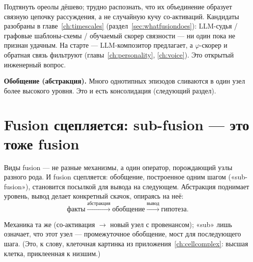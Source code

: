 \begin{openq}
Подтянуть ореолы дёшево; трудно распознать, что их объединение образует
связную цепочку рассуждения, а не случайную кучу со-активаций. Кандидаты
разобраны в главе~\ref{ch:timescales} (раздел~\ref{sec:whatfusiondoes}):
LLM-судья / графовые шаблоны-схемы / обучаемый скорер связности --- ни один
пока не признан удачным. На старте --- LLM-композитор предлагает, а
$\varphi$-скорер и обратная связь фильтруют
(главы~\ref{ch:personality}, \ref{ch:voice}). Это открытый инженерный вопрос.
\end{openq}

\smallskip\noindent\textbf{Обобщение (абстракция).}
Много однотипных эпизодов сливаются в один узел более высокого уровня. Это и
есть консолидация (следующий раздел).

\section{Fusion сцепляется: sub-fusion --- это тоже fusion}

Виды fusion --- не разные механизмы, а один оператор, порождающий узлы разного
рода. И fusion сцепляется: обобщение, построенное одним шагом («sub-fusion»),
становится посылкой для вывода на следующем. Абстракция поднимает уровень,
вывод делает конкретный скачок, опираясь на неё:
\[
\text{факты} \xrightarrow{\text{абстракция}} \text{обобщение}
\xrightarrow{\text{вывод}} \text{гипотеза}.
\]

Механика та же (со-активация $\to$ новый узел с провенансом); «sub» лишь
означает, что этот узел --- промежуточное обобщение, мост для последующего
шага. (Это, к слову, клеточная картинка из приложения~\ref{ch:cellcomplex}:
высшая клетка, приклеенная к низшим.)

